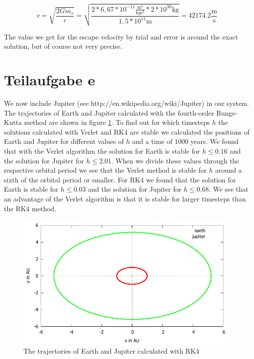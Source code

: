 \documentclass[11pt,a4wide]{article}
\begin{document}
\begin{equation} 
v=\sqrt{\frac{2Gm_{s}}{r}}=\sqrt{\frac{2*6,67*10^{-11}\frac{\text{m}^3}{\text{kg}\text{s}^2}*2*10^{30}\text{kg}}{1,5*10^{11}\text{m}}}=42174.2\frac{\text{m}}{\text{s}}
\end{equation}

The value we get for the escape velocity by trial and error is around the exact solution, but of course not very precise.  

\section{Teilaufgabe e}
We now include Jupiter (see http://en.wikipedia.org/wiki/Jupiter) in our system. The trajectories of Earth and Jupiter calculated with the fourth-order Runge-Kutta method are shown in figure \ref{fig:Earth and Jupiter XY}. To find out for which timesteps $h$ the solutions calculated with Verlet and RK$4$ are stable we calculated the positions of Earth and Jupiter for different values of $h$ and a time of $1000$ years. We found that with the Verlet algorithm the solution for Earth is stable for $h\le 0.16$ and the solution for Jupiter for $h\le 2.01$. When we divide these values through the respective orbital period we see that the Verlet method is stable for $h$ around a sixth of the orbital period or smaller. For RK$4$ we found that the solution for Earth is stable for $h\le 0.03$ and the solution for Jupiter for $h\le 0.68$. We see that an advantage of the Verlet algorithm is that it is stable for larger timesteps than the RK$4$ method. 

\begin{figure}
\centering
\includegraphics[scale=0.45]{jupiter_earthXY.pdf}
\caption{The trajectories of Earth and Jupiter calculated with RK$4$}
\label{fig:Earth and Jupiter XY}
\end{figure}  
\end{document}

